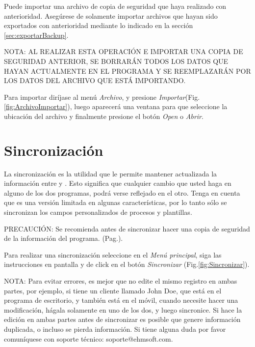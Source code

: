 Puede importar una archivo de copia de seguridad que haya realizado con anterioridad. Aseg\'urese de solamente importar archivos que hayan sido exportados con anterioridad mediante lo indicado en la secci\'on \ref{sec:exportarBackup}.

NOTA: AL REALIZAR ESTA OPERACI\'ON E IMPORTAR UNA COPIA DE SEGURIDAD ANTERIOR, SE BORRAR\'AN TODOS LOS DATOS QUE HAYAN ACTUALMENTE EN EL PROGRAMA Y SE REEMPLAZAR\'AN POR LOS DATOS DEL ARCHIVO QUE EST\'A IMPORTANDO.

Para importar dir\'ijase al men\'u \emph{Archivo}, y presione \emph{Importar}(Fig.\ref{fig:ArchivoImportar}), luego aparecer\'a una ventana para que seleccione la ubicaci\'on del archivo y finalmente presione el bot\'on \emph{Open} o \emph{Abrir}.


\section{Sincronizaci\'on}

La sincronizaci\'on es la utilidad que le permite mantener actualizada la informaci\'on entre \softwareAbogadosDesktop y \softwareAbogadosMobile. Esto significa que cualquier cambio que usted haga en alguno de los dos programas, podr\'a verse reflejado en el otro. Tenga en cuenta que \softwareAbogadosMobile es una versi\'on limitada en algunas caracter\'isticas, por lo tanto s\'olo se sincronizan los campos personalizados de procesos y plantillas.

PRECAUCI\'ON: Se recomienda antes de sincronizar hacer una copia de seguridad de la informaci\'on del programa. (Pag.\pageref{sec:exportarBackup}).

Para realizar una sincronizaci\'on seleccione en el \emph{Men\'u principal}, siga las instrucciones en pantalla y de click en el bot\'on \emph{Sincronizar} (Fig.\ref{fig:Sincronizar}). 
  

NOTA: Para evitar errores, es mejor que no edite el mismo registro en ambas partes, por ejemplo, si tiene un cliente llamado John Doe, que est\'a en el programa de escritorio, y tambi\'en est\'a en el m\'ovil, cuando necesite hacer una modificaci\'on, h\'agala solamente en uno de los dos, y luego sincronice. Si hace la edici\'on en ambas partes antes de sincronizar es posible que genere informaci\'on duplicada, o incluso se pierda informaci\'on. Si tiene alguna duda por favor comun\'iquese con soporte t\'ecnico: \mbox{soporte@ehmsoft.com}.

